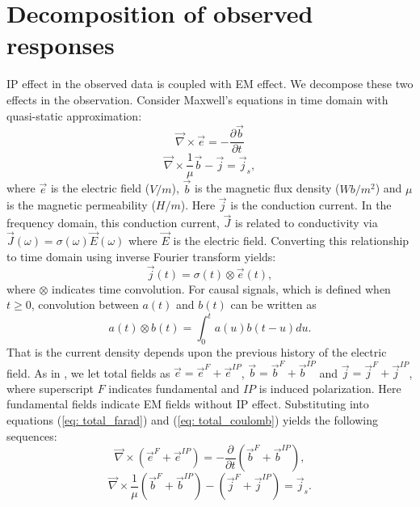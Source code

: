 \documentclass[a4paper, 11pt]{article}
\newcommand{\curl}{{\vec \nabla}\times}
\newcommand {\J}{{\vec J}}
\newcommand {\E}{{\vec E}}
\renewcommand {\j}  { {\vec j} }
\renewcommand {\b}  { {\vec b} }
\newcommand {\e}  { {\vec e} }
\begin{document}

\section{Decomposition of observed responses}
IP effect in the observed data is coupled with EM effect. We decompose these two effects in the observation. 
Consider Maxwell's equations in time domain with quasi-static approximation:
\begin{equation}
  \curl{\e} = -\frac{\partial \b}{\partial t}
  \label{eq: total_farad}
\end{equation}
\begin{equation}
  \curl{\frac{1}{\mu}\b} - \j= \j_{s},
  \label{eq: total_coulomb}
\end{equation}
where $\e$ is the electric field ($V/m$), $\b$ is the magnetic flux density ($Wb/m^2$) and $\mu$ is the magnetic permeability ($H/m$). Here $\j$ is the conduction current. In the frequency domain, this conduction current, $\J$ is related to conductivity via $\J(\omega) = \sigma(\omega)\E(\omega)$ where $\E$ is the electric field. 
Converting this relationship to time domain using inverse Fourier transform yields:
\begin{equation}
  \j(t) = \sigma(t)\otimes \e(t),
  \label{eq: ohmslaw1}
\end{equation}
where $\otimes$ indicates time convolution. 
For causal signals, which is defined when $t \ge 0$, convolution between $a(t)$ and $b(t)$ can be written as
\begin{equation}
  a(t) \otimes b(t) = \int_0^t a(u) b(t-u) du.
  \label{eq: convolution}
\end{equation}
That is the current density depends upon the previous history of the electric field.
As in \cite{Smith1988a}, we let total fields as $\e = \e^{F} + \e^{IP}$, $\b = \b^{F} + \b^{IP}$ and $\j = \j^{F} + \j^{IP}$, where superscript $F$ indicates fundamental and $IP$ is induced polarization. 
Here fundamental fields indicate EM fields without IP effect. 
Substituting into equations (\ref{eq: total_farad}) and (\ref{eq: total_coulomb}) yields the following sequences:
\begin{equation}
  \curl({\e^{F}+\e^{IP}}) = -\frac{\partial}{\partial t} (\b^{F}+\b^{IP}),
\end{equation}
\begin{equation}
  \curl\frac{1}{\mu}(\b^{F}+\b^{IP}) - (\j^{F}+\j^{IP})= \j_{s}.
\end{equation}
\end{document}

